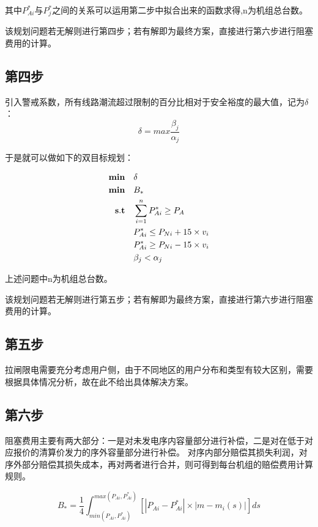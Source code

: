 \documentclass[12pt,a4paper]{ctexart}
\begin{document}
其中$P_{Ai}^{*}$与$P_{j}^{*}$之间的关系可以运用第二步中拟合出来的函数求得,n为机组总台数。

该规划问题若无解则进行第四步；若有解即为最终方案，直接进行第六步进行阻塞费用的计算。
	
	\subsection{第四步}
	
	引入警戒系数，所有线路潮流超过限制的百分比相对于安全裕度的最大值，记为$\delta$：
	\begin{equation}
		\delta = max{\frac{\beta_{j}}{\alpha_{j}}}
	\end{equation}
	
	于是就可以做如下的双目标规划：
	
	\begin{equation*}
		\begin{split}
			{\bf min}\quad &\delta \\
			{\bf min}\quad &B_{*}\\
			{\bf s.t}\quad &\sum_{i=1}^{n}P_{Ai}^{*} \ge P_{A}\\
			&P_{Ai}^{*} \le P_{Ni} + 15\times v_{i} \\
			&P_{Ai}^{*} \ge P_{Ni} - 15\times v_{i} \\
			&\beta_{j} <	\alpha_{j}\\
		\end{split}
	\end{equation*}
	
	上述问题中n为机组总台数。
	
	该规划问题若无解则进行第五步；若有解即为最终方案，直接进行第六步进行阻塞费用的计算。
	
	\subsection{第五步}
	拉闸限电需要充分考虑用户侧，由于不同地区的用户分布和类型有较大区别，需要根据具体情况分析，故在此不给出具体解决方案。
	
	\subsection{第六步}
	阻塞费用主要有两大部分：一是对未发电序内容量部分进行补偿，二是对在低于对应报价的清算价发力的序外容量部分进行补偿。
	对序内部分赔偿其损失利润，对序外部分赔偿其损失成本，再对两者进行合并，则可得到每台机组的赔偿费用计算规则。
	
	\begin{equation}
		B_{*}=\dfrac{1}{4} \int_{min{(P_{Ai},P_{Ai}^{*})}}^{max{(P_{Ai},P_{Ai}^{*})}} [|P_{Ai}-P_{Ai}^{*}|\times |m-m_{i}(s)|] ds
		\label{1}
	\end{equation}
	
\end{document}
